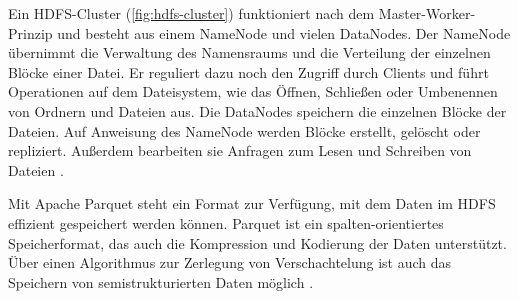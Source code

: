 Ein HDFS-Cluster (\cref{fig:hdfs-cluster}) funktioniert nach dem Master-Worker-Prinzip und besteht aus einem NameNode und vielen DataNodes.
Der NameNode übernimmt die Verwaltung des Namensraums und die Verteilung der einzelnen Blöcke einer Datei.
Er reguliert dazu noch den Zugriff durch Clients und führt Operationen auf dem Dateisystem, wie das Öffnen, Schließen oder Umbenennen von Ordnern und Dateien aus.
Die DataNodes speichern die einzelnen Blöcke der Dateien.
Auf Anweisung des NameNode werden Blöcke erstellt, gelöscht oder repliziert.
Außerdem bearbeiten sie Anfragen zum Lesen und Schreiben von Dateien \parencite{hdfs}.

Mit Apache Parquet steht ein Format zur Verfügung, mit dem Daten im HDFS effizient gespeichert werden können.
Parquet ist ein spalten-orientiertes Speicherformat, das auch die Kompression und Kodierung der Daten unterstützt.
Über einen Algorithmus zur Zerlegung von Verschachtelung ist auch das Speichern von semistrukturierten Daten möglich \parencite{parquet}.
